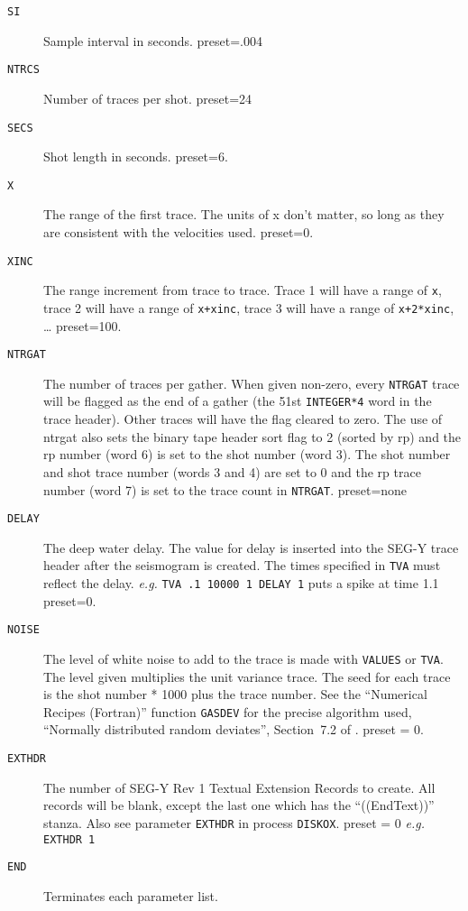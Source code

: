 \begin{description}
\item[\texttt{SI}] Sample interval in seconds.
         \Gls{preset}=.004

\item[\texttt{NTRCS}] Number of traces per \gls{shot}.
         \Gls{preset}=24

\item[\texttt{SECS}] Shot length in seconds.
         \Gls{preset}=6.

\item[\texttt{X}] The range of the first trace.  The units of x don't matter, so
         long as they are consistent with the velocities used.
         \Gls{preset}=0.

\item[\texttt{XINC}] The range increment from trace to trace.  Trace 1 will have a
    range of \texttt{x}, trace 2 will have a range of \texttt{x+xinc}, trace 3 will
         have a range of \texttt{x+2*xinc}, \ldots
         \Gls{preset}=100.

\item[\texttt{NTRGAT}] The number of traces per \gls{gather}.  When given non-zero, every
         \texttt{NTRGAT} trace will be flagged as the end of a \gls{gather} (the 51st
         \texttt{INTEGER*4} word in the trace header).  Other traces will have
         the flag cleared to zero.  The use of ntrgat also sets the
         binary tape header sort flag to 2 (sorted by \gls{rp}) and the \gls{rp}
         number (word 6) is set to the \gls{shot} number (word 3).  The \gls{shot}
         number and \gls{shot} trace number (words 3 and 4) are set to 0 and the
         \gls{rp} trace number (word 7) is set to the trace count in \texttt{NTRGAT}.
         \Gls{preset}=none

\item[\texttt{DELAY}] The deep water delay.  The value for delay is inserted into the
         SEG-Y trace header after the seismogram is created.  The times
         specified in \texttt{TVA} must reflect the delay.
         \textit{e.g.} \texttt{TVA .1 10000 1 DELAY 1}  puts a spike at time 1.1
         \Gls{preset}=0.

\item[\texttt{NOISE}] The level of white noise to add to the trace is made with
         \texttt{VALUES} or \texttt{TVA}.  The level given multiplies the unit variance
         trace.  The seed for each trace is the \gls{shot} number * 1000 plus
         the trace number.  See the ``Numerical Recipes (Fortran)'' function
         \texttt{GASDEV} for the precise algorithm used, ``Normally distributed random deviates'', Section~7.2 of \cite{WHPress1989a}.
         \Gls{preset} = 0.

\item[\texttt{EXTHDR}] The number of SEG-Y Rev 1 Textual Extension Records to create.
         All records will be blank, except the last one which has the
         ``((EndText))'' stanza.  Also see parameter \texttt{EXTHDR} in process
         \texttt{DISKOX}.
         \Gls{preset} = 0        \textit{e.g.}   \texttt{EXTHDR 1}

\item[\texttt{END}] Terminates each parameter list.
\end{description}

